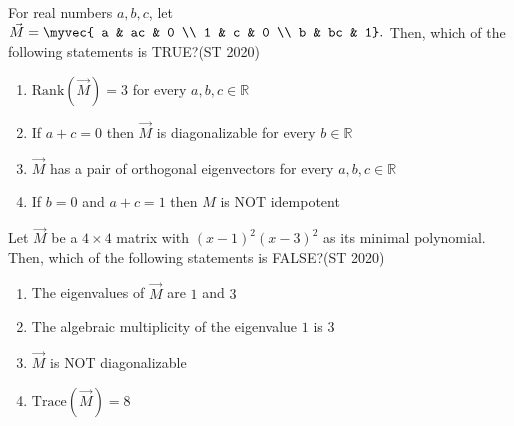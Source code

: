 \item For real numbers $a, b, c$, let 
$\vec{M} = \myvec{
a & ac & 0 \\
1 & c  & 0 \\
b & bc & 1}.$
Then, which of the following statements is {TRUE}?\hfill {(ST 2020)}
\begin{enumerate}
\item $\text{Rank}(\vec{M}) = 3$ for every $a,b,c \in \mathbb{R}$
\item If $a+c=0$ then $\vec{M}$ is diagonalizable for every $b \in \mathbb{R}$
\item $\vec{M}$ has a pair of orthogonal eigenvectors for every $a,b,c \in \mathbb{R}$
\item If $b=0$ and $a+c=1$ then $M$ is {NOT} idempotent
\end{enumerate}
\item Let $\vec{M}$ be a $4 \times 4$ matrix with $(x-1)^2(x-3)^2$ as its minimal polynomial. Then, which of the following statements is {FALSE}?\hfill {(ST 2020)}
\begin{enumerate}
\item The eigenvalues of $\vec{M}$ are $1$ and $3$
\item The algebraic multiplicity of the eigenvalue $1$ is $3$
\item $\vec{M}$ is {NOT} diagonalizable
\item $\text{Trace}(\vec{M}) = 8$
\end{enumerate}

